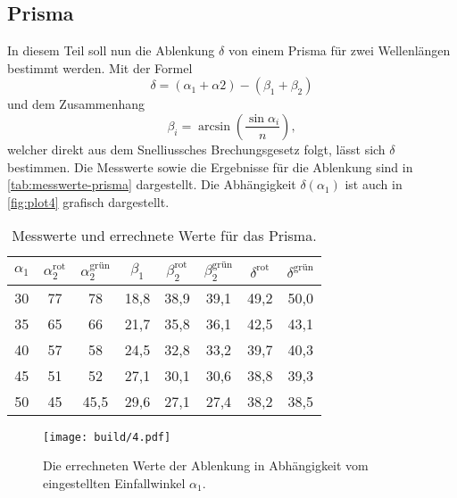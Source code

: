 \subsection{Prisma}
\label{sec:Prisma}
In diesem Teil soll nun die Ablenkung $\delta$ von einem Prisma für zwei Wellenlängen
bestimmt werden. Mit der Formel
\begin{equation}
	\delta = (\alpha_1 + \alpha2) - (\beta_1 + \beta_2)
\end{equation}
und dem Zusammenhang
\begin{equation}
	\beta_i = \arcsin\left(\frac{\sin\alpha_i}{n}\right),
\end{equation}
welcher direkt aus dem Snelliussches Brechungsgesetz folgt, lässt sich $\delta$ bestimmen.
Die Messwerte sowie die Ergebnisse für die Ablenkung sind in \autoref{tab:messwerte-prisma}
dargestellt. Die Abhängigkeit $\delta(\alpha_1)$ ist auch in \autoref{fig:plot4} grafisch
dargestellt.
\begin{table}
	\centering
	\caption{Messwerte und errechnete Werte für das Prisma.}
	\label{tab:messwerte-prisma}
	\begin{tabular}{c c c c c c c c}
		\toprule
		$\alpha_1$ &
		$\alpha_2^\text{rot}$ &
		$\alpha_2^\text{grün}$ &
		$\beta_1$ &
		$\beta_2^\text{rot}$ &
		$\beta_2^\text{grün}$ &
		$\delta^\text{rot}$ &
		$\delta^\text{grün}$ \\
		\midrule
		30 & 77 & 78   & 18,8 & 38,9 & 39,1 & 49,2 & 50,0	\\
		35 & 65 & 66   & 21,7 & 35,8 & 36,1 & 42,5 & 43,1	\\
		40 & 57 & 58   & 24,5 & 32,8 & 33,2 & 39,7 & 40,3	\\
		45 & 51 & 52   & 27,1 & 30,1 & 30,6 & 38,8 & 39,3	\\
		50 & 45 & 45,5 & 29,6 & 27,1 & 27,4 & 38,2 & 38,5	\\
		\bottomrule
	\end{tabular}
\end{table}
\begin{figure}[H]
	\centering
	\texttt{[image: build/4.pdf]}
	\caption{Die errechneten Werte der Ablenkung in Abhängigkeit vom eingestellten
	Einfallwinkel $\alpha_1$.}
	\label{fig:plot4}
\end{figure}

